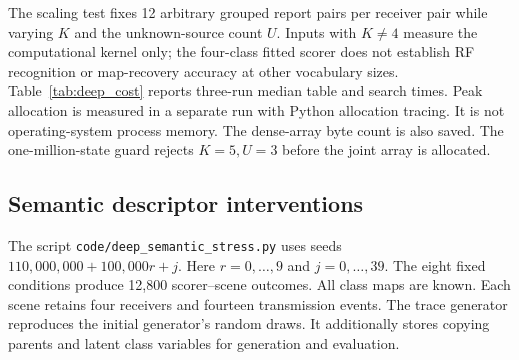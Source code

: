 The scaling test fixes 12 arbitrary grouped report pairs per receiver pair while varying $K$ and the unknown-source count $U$. Inputs with $K\ne4$ measure the computational kernel only; the four-class fitted scorer does not establish RF recognition or map-recovery accuracy at other vocabulary sizes. Table~\ref{tab:deep_cost} reports three-run median table and search times. Peak allocation is measured in a separate run with Python allocation tracing. It is not operating-system process memory. The dense-array byte count is also saved. The one-million-state guard rejects $K=5,U=3$ before the joint array is allocated.

\begin{table}[!htb]\caption{Conditional-map computational scaling. $U$ excludes the known reference receiver. Timings are medians of three runs. Traced allocation peaks differ from process resident memory. Cases with $K\ne4$ provide computational measurements only.}\label{tab:deep_cost}
\small\setlength{\tabcolsep}{3pt}\end{table}
\FloatBarrier

\subsection{Semantic descriptor interventions}
The script \texttt{code/deep\_semantic\_stress.py} uses seeds $110{,}000{,}000+100{,}000r+j$. Here $r=0,\ldots,9$ and $j=0,\ldots,39$. The eight fixed conditions produce 12,800 scorer--scene outcomes. All class maps are known. Each scene retains four receivers and fourteen transmission events. The trace generator reproduces the initial generator's random draws. It additionally stores copying parents and latent class variables for generation and evaluation.

